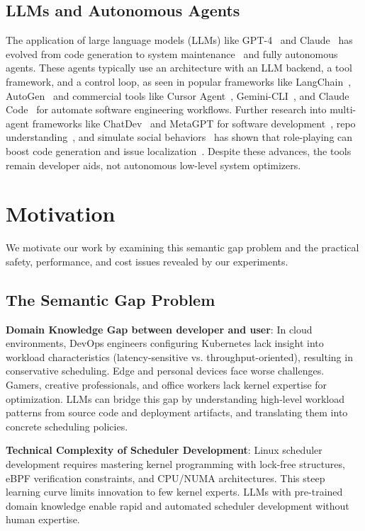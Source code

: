 \documentclass[preprint]{article}
\begin{document}
\subsection{LLMs and Autonomous Agents}

The application of large language models (LLMs) like GPT-4~\cite{openai2023gpt4} and Claude~\cite{anthropic2024claude} has evolved from code generation to system maintenance~\cite{de2025llm} and fully autonomous agents. These agents typically use an architecture with an LLM backend, a tool framework, and a control loop, as seen in popular frameworks like LangChain~\cite{langchain}, AutoGen~\cite{autogen} and commercial tools like Cursor Agent~\cite{cursor}, Gemini-CLI~\cite{geminicli}, and Claude Code~\cite{claudecode} for automate software engineering workflows. Further research into multi-agent frameworks like ChatDev~\cite{qian2024chatdev} and MetaGPT for software development~\cite{hong2023metagpt}, repo understanding~\cite{coderesearcher2025}, and simulate social behaviors~\cite{agent4se2024} has shown that role-playing can boost code generation and issue localization~\cite{Lin2025FlowGen,Batole2025LocalizeAgent}. Despite these advances, the tools remain developer aids, not autonomous low-level system optimizers.
\section{Motivation}
\label{sec:motivation}

We motivate our work by examining this semantic gap problem and the practical safety, performance, and cost issues revealed by our experiments.

\subsection{The Semantic Gap Problem}

\textbf{Domain Knowledge Gap between developer and user}: In cloud environments, DevOps engineers configuring Kubernetes lack insight into workload characteristics (latency-sensitive vs. throughput-oriented), resulting in conservative scheduling. Edge and personal devices face worse challenges. Gamers, creative professionals, and office workers lack kernel expertise for optimization. LLMs can bridge this gap by understanding high-level workload patterns from source code and deployment artifacts, and translating them into concrete scheduling policies.

\textbf{Technical Complexity of Scheduler Development}: Linux scheduler development requires mastering kernel programming with lock-free structures, eBPF verification constraints, and CPU/NUMA architectures. This steep learning curve limits innovation to few kernel experts. LLMs with pre-trained domain knowledge enable rapid and automated scheduler development without human expertise.
\end{document}
